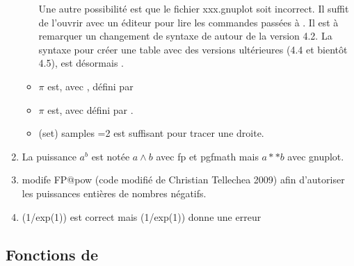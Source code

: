 \begin{enumerate}
\begin{itemize}
Une autre possibilité est que le fichier xxx.gnuplot soit incorrect. Il suffit de l'ouvrir avec un éditeur pour lire les commandes passées à . Il est à remarquer un changement de syntaxe de  autour de la version 4.2. La syntaxe pour créer une table avec des versions ultérieures (4.4 et bientôt 4.5), est désormais  . 


   \item $\pi$ est, avec , défini par 
   \item  $\pi$ est, avec  défini par .   
   \item (set) samples =2 est suffisant pour tracer une droite.
  \end{itemize}
 
 \item La puissance $a^b$ est notée $a \wedge b$ avec fp et pgfmath mais $a**b$ avec gnuplot.
 
 \item {} modife FP@pow  (code modifié de Christian Tellechea 2009) afin d'autoriser les puissances entières de nombres  négatifs.


\item ({1/exp(1)}) est correct mais (1/exp(1)) donne une erreur
\end{enumerate}

\subsection{Fonctions de }


